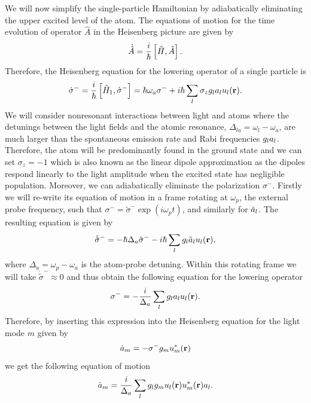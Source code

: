 We will now simplify the single-particle Hamiltonian by adiabatically
eliminating the upper excited level of the atom. The equations of
motion for the time evolution of operator $\hat{A}$ in the Heisenberg
picture are given by
\begin{equation}
  \dot{\hat{A}} = \frac{i}{\hbar} \left[\hat{H}, \hat{A} \right].
\end{equation}
Therefore, the Heisenberg equation for the lowering operator of a
single particle is
\begin{equation}
  \dot{\sigma}^- = \frac{i}{\hbar} \left[\hat{H}_1, \hat{\sigma}^- \right]
  = \hbar \omega_a \sigma^- + i \hbar \sum_l \sigma_z g_l a_l u_l(\mathbf{r}).
\end{equation}
We will consider nonresonant interactions between light and atoms
where the detunings between the light fields and the atomic resonance,
$\Delta_{la} = \omega_l - \omega_a$, are much larger than the
spontaneous emission rate and Rabi frequencies $g_l a_l$. Therefore,
the atom will be predominantly found in the ground state and we can
set $\sigma_z = -1$ which is also known as the linear dipole
approximation as the dipoles respond linearly to the light amplitude
when the excited state has negligible population. Moreover, we can
adiabatically eliminate the polarization $\sigma^-$. Firstly we will
re-write its equation of motion in a frame rotating at $\omega_p$, the
external probe frequency, such that
$\sigma^- = \tilde{\sigma}^- \exp(i \omega_p t)$, and similarly for
$\tilde{a}_l$. The resulting equation is given by
\begin{equation}
  \dot{\tilde{\sigma}}^- = - \hbar \Delta_a \tilde{\sigma}^- - i \hbar
  \sum_l g_l \tilde{a}_l u_l(\mathbf{r}),
\end{equation}
where $\Delta_a = \omega_p - \omega_a$ is the atom-probe
detuning. Within this rotating frame we will take
$\dot{\tilde{\sigma}}^- \approx 0$ and thus obtain the following
equation for the lowering operator
\begin{equation}
  \label{eq:sigmam}
  \sigma^- = - \frac{i}{\Delta_a} \sum_l g_l a_l u_l(\mathbf{r}).
\end{equation}
Therefore, by inserting this expression into the Heisenberg equation
for the light mode $m$ given by
\begin{equation}
  \dot{a}_m = - \sigma^- g_m u^*_m(\mathbf{r})
\end{equation}
we get the following equation of motion
\begin{equation}
  \dot{a}_m = \frac{i}{\Delta_a} \sum_l g_l g_m u_l(\mathbf{r})
  u^*_m(\mathbf{r}) a_l.
\end{equation}
